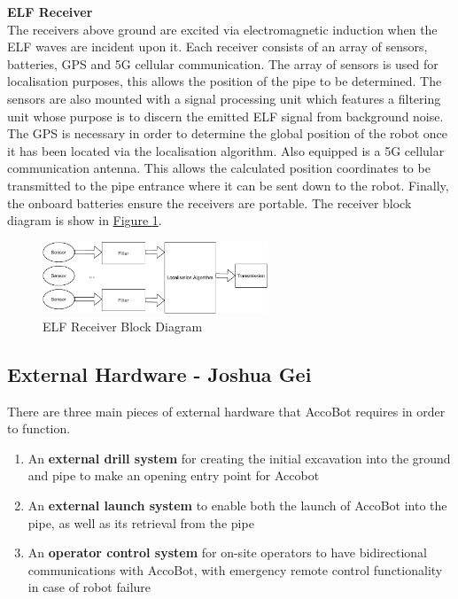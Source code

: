 \documentclass[11pt]{article}		%
\newcommand{\figref}[1]{\hyperref[#1]{Figure \ref*{#1}}}    %
\begin{document}
			\textbf{ELF Receiver}\\
			The receivers above ground are excited via electromagnetic induction when the ELF waves are incident upon it. Each receiver consists of an array of sensors, batteries, GPS and 5G cellular communication. The array of sensors is used for localisation purposes, this allows the position of the pipe to be determined. The sensors are also mounted with a signal processing unit which features a filtering unit whose purpose is to discern the emitted ELF signal from background noise. The GPS is necessary in order to determine the global position of the robot once it has been located via the localisation algorithm. Also equipped is a 5G cellular communication antenna. This allows the calculated position coordinates to be transmitted to the pipe entrance where it can be sent down to the robot.  Finally, the onboard batteries ensure the receivers are portable. The receiver block diagram is show in \figref{ELFrec}.
		    
		    \begin{figure}[h]
				\centering
				\includegraphics[width=0.6\textwidth]{blockreceiever}
				\caption{ELF Receiver Block Diagram}
				\label{ELFrec}
			\end{figure}
	
		\subsection[External Hardware]{External Hardware - Joshua Gei}
		There are three main pieces of external hardware that AccoBot requires in order to function. 
        \begin{enumerate}
        \item An \textbf{external drill system} for creating the initial excavation into the ground and pipe to make an opening entry point for Accobot
        \item An \textbf{external launch system} to enable both the launch of AccoBot into the pipe, as well as its retrieval from the pipe
        \item An \textbf{operator control system} for on-site operators to have bidirectional communications with AccoBot, with emergency remote control functionality in case of robot failure
        \end{enumerate}
		
\end{document}
